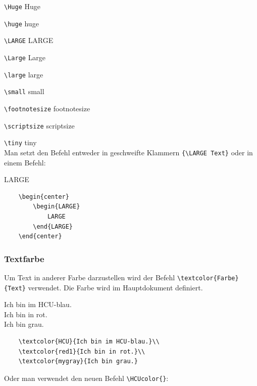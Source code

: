 \verb|\Huge| \hfill {\Huge Huge}

\verb|\huge| \hfill {\huge huge}

\verb|\LARGE| \hfill {\LARGE LARGE}

\verb|\Large| \hfill {\Large Large}

\verb|\large| \hfill {\large large}

\verb|\small| \hfill {\small small}

\verb|\footnotesize| \hfill {\footnotesize footnotesize}

\verb|\scriptsize| \hfill {\scriptsize scriptsize}

\verb|\tiny| \hfill {\tiny tiny}\\

Man setzt den Befehl entweder in geschweifte Klammern \verb|{\LARGE Text}| oder in einem Befehl:

\begin{center}
    \begin{LARGE}
        LARGE
    \end{LARGE}
\end{center}


\begin{verbatim}
    \begin{center}
        \begin{LARGE}
            LARGE
        \end{LARGE}
    \end{center}
\end{verbatim}


\subsubsection{Textfarbe}

Um Text in anderer Farbe darzustellen wird der Befehl \verb|\textcolor{Farbe}{Text}| verwendet. Die Farbe wird im Hauptdokument definiert.

\textcolor{HCU}{Ich bin im HCU-blau.}\\
\textcolor{red1}{Ich bin in rot.}\\
\textcolor{mygray}{Ich bin grau.}

\begin{verbatim}
    \textcolor{HCU}{Ich bin im HCU-blau.}\\
    \textcolor{red1}{Ich bin in rot.}\\
    \textcolor{mygray}{Ich bin grau.}
\end{verbatim}

Oder man verwendet den neuen Befehl \verb|\HCUcolor{}|:

